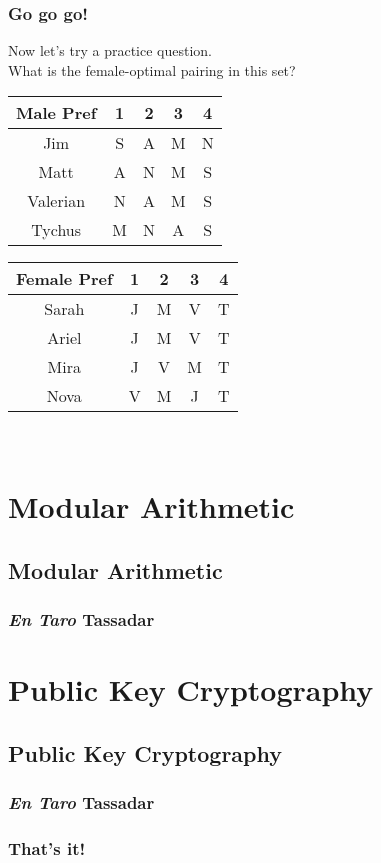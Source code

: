 \documentclass[9pt]{beamer}
\begin{document}
\begin{frame}[fragile]
\frametitle{Go go go!}
Now let's try a practice question.\\ 
What is the female-optimal pairing in this set?\\ %
\begin{tabular}{|c|c|c|c|c|}
\hline
Male Pref & 1 & 2 & 3 & 4\\
\hline
Jim & S & A & M & N\\
Matt & A & N & M & S\\
Valerian & N & A & M & S\\
Tychus & M & N & A & S\\
\hline
\end{tabular}
\quad
\begin{tabular}{|c|c|c|c|c|}
\hline
Female Pref & 1 & 2 & 3 & 4\\
\hline
Sarah & J & M & V & T\\
Ariel & J & M & V & T\\
Mira & J & V & M & T\\
Nova & V & M & J & T\\
\hline
\end{tabular}
\newline
\\
\end{frame}


\section{Modular Arithmetic}
  \subsection{Modular Arithmetic}

\begin{frame}[fragile]
  \frametitle{\emph{En Taro} Tassadar}
\end{frame}


\section{Public Key Cryptography}
  \subsection{Public Key Cryptography}

\begin{frame}[fragile]
  \frametitle{\emph{En Taro} Tassadar}
\end{frame}


\begin{frame}
  \frametitle{\huge{That's it!}}
\end{frame}
\end{document}
